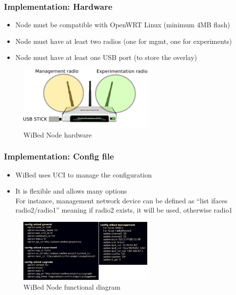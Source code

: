 \documentclass[usepdftitle=false,13pt]{beamer}
\begin{document}
\begin{frame}\frametitle{Implementation: Hardware}

	\begin{itemize}
	\item Node must be compatible with OpenWRT Linux (minimum 4MB flash)
	\item Node must have at least two radios (one for mgmt, one for experiments)
	\item Node must have at least one USB port (to store the overlay)
	\end{itemize}

	\begin{figure}[h!]
	\begin{center}
	\includegraphics[width=0.6\textwidth]{pic/nodehw}
	  \caption{WiBed Node hardware}
	\label{fig:funct}
	\end{center}
	\end{figure}
\end{frame}



\begin{frame}\frametitle{Implementation: Config file}

	\begin{itemize}
	\item WiBed uses UCI to manage the configuration
	\item It is flexible and allows many options
	\\
	For instance, management network device can be defined as ``list ifaces radio2/radio1'' meaning if radio2 exists, it will be used, otherwise radio1
	\end{itemize}

	\begin{figure}[h!]
	\begin{center}
	\includegraphics[width=0.6\textwidth]{pic/config}
	  \caption{WiBed Node functional diagram}
	\label{fig:funct}
	\end{center}
	\end{figure}
\end{frame}
\end{document}
